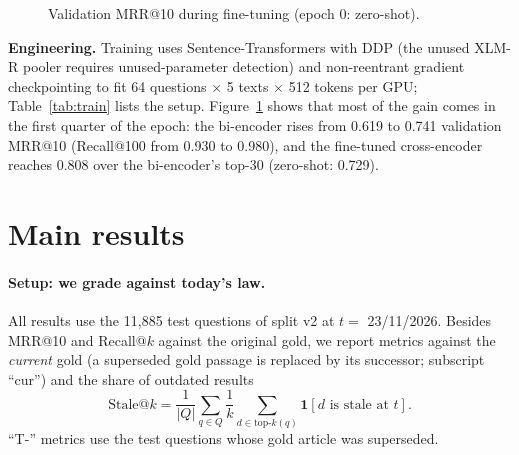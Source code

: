 \documentclass{article} %
\begin{document}
\begin{figure}
\vspace{-4mm}
\centering
{}
\vspace{-2mm}
\caption{Validation MRR@10 during fine-tuning (epoch 0: zero-shot).}
\label{fig:curves}
\vspace{-4mm}
\end{figure}
\textbf{Engineering.} Training uses Sentence-Transformers with DDP (the unused XLM-R pooler requires
unused-parameter detection) and non-reentrant gradient checkpointing to fit 64 questions $\times$ 5 texts $\times$ 512
tokens per GPU; Table~\ref{tab:train} lists the setup. Figure~\ref{fig:curves} shows that most of the gain comes in the first
quarter of the epoch: the bi-encoder rises from 0.619 to 0.741 validation MRR@10 (Recall@100 from 0.930 to 0.980), and
the fine-tuned cross-encoder reaches 0.808 over the bi-encoder's top-30 (zero-shot: 0.729).

\section{Main results}
\label{sec:results}
\paragraph{Setup: we grade against today's law.}
All results use the 11,885 test questions of split v2 at $t = $ 23/11/2026. Besides MRR@10 and Recall@$k$ against the
original gold, we report metrics against the \emph{current} gold (a superseded gold passage is replaced by its successor;
subscript ``cur'') and the share of outdated results
\[
\mathrm{Stale@}k = \frac{1}{\lvert Q \rvert} \sum_{q \in Q} \frac{1}{k} \sum_{d \in \mathrm{top}\text{-}k(q)}
\mathbf{1}\left[d \text{ is stale at } t\right].
\]
``T-'' metrics use the \ResNTemporal{} test questions whose gold article was superseded.
\end{document}
